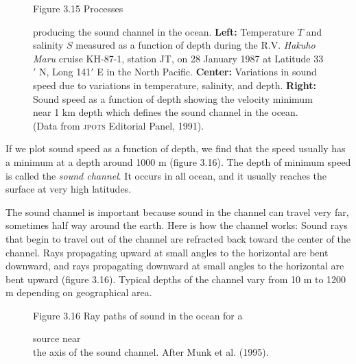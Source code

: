 \begin{figure}[t!]
\footnotesize
Figure 3.15 Processes \rule{0pt}{4ex}producing the sound channel
in the ocean.
\textbf{Left:} Temperature $T$ and salinity $S$ measured as a function of depth during the R.V.
\textit{Hakuho Maru} cruise KH-87-1, station JT, on 28 January 1987 at Latitude 33$'$ N, Long 141$'$ E in the North Pacific.
\textbf{Center:} Variations in sound speed due to
variations in temperature, salinity, and depth. \textbf{Right:} Sound
speed as a function of depth showing the velocity
minimum near 1 km depth which defines the sound channel in
the ocean. (Data from \textsc{jpots} Editorial Panel, 1991).
\label{fig:soundprofile}
\vspace{-3ex}
\end{figure}

If we plot sound speed as a function of depth, we find
that the speed usually has a minimum at a depth around 1000 m (figure 3.16). The depth of
minimum speed is called the \textit{sound channel}. It occurs in
all ocean, and it usually reaches the surface at very high latitudes.

The sound channel is important because sound in the
channel can travel very far, sometimes half way around the earth. Here is how the channel
works: Sound rays that begin to travel out of the channel
are refracted back toward the center of the channel. Rays propagating upward at small angles
to the horizontal are bent downward, and rays propagating downward at small angles to the
horizontal are bent upward (figure 3.16). Typical depths of the chan\-nel vary from 10 m to
1200 m depending on geographical area.

\begin{figure}[t!]
\footnotesize
\centering
Figure 3.16 Ray paths of sound in the ocean for a
\rule{0pt}{3ex}source near\\the axis of the sound channel. After Munk et al. (1995).

\label{fig:raypaths}
\vspace{-3ex}
\end{figure}

